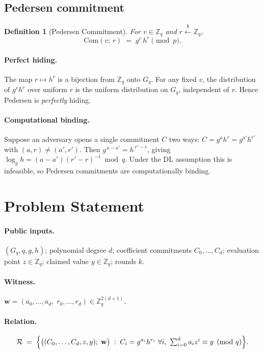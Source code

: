 \documentclass[11pt,a4paper]{article}
\newtheorem{definition}{Definition}
\begin{document}
\subsection{Pedersen commitment}

\begin{definition}[Pedersen Commitment]
For $v \in \mathbb{Z}_q$ and $r \xleftarrow{\$} \mathbb{Z}_q$,
\[
\mathrm{Com}(v;\,r) \;=\; g^{v}\,h^{r} \pmod p.
\]
\end{definition}

\paragraph{Perfect hiding.} The map $r \mapsto h^{r}$ is a bijection from
$\mathbb{Z}_q$ onto $G_q$. For any fixed $v$, the distribution of
$g^{v}h^{r}$ over uniform $r$ is the uniform distribution on $G_q$,
independent of $v$. Hence Pedersen is \emph{perfectly} hiding.

\paragraph{Computational binding.} Suppose an adversary opens a single
commitment $C$ two ways: $C = g^{a}h^{r} = g^{a'}h^{r'}$ with
$(a,r)\neq(a',r')$. Then $g^{\,a-a'} = h^{\,r'-r}$, giving
$\log_g h = (a-a')(r'-r)^{-1} \bmod q$. Under the DL assumption this is
infeasible, so Pedersen commitments are computationally binding.

\section{Problem Statement}

\paragraph{Public inputs.} $(G_q, q, g, h)$; polynomial degree $d$;
coefficient commitments $C_0,\dots,C_d$; evaluation point
$z \in \mathbb{Z}_q$; claimed value $y \in \mathbb{Z}_q$; rounds $k$.

\paragraph{Witness.} $\mathbf{w} = (a_0,\dots,a_d,\; r_0,\dots,r_d)
\in \mathbb{Z}_q^{2(d+1)}$.

\paragraph{Relation.}
\[
\mathcal{R} \;=\; \Bigl\{\bigl((C_0,\dots,C_d,z,y);\;\mathbf{w}\bigr)
\;:\; C_i = g^{a_i}h^{r_i}\ \forall i,\
\textstyle\sum_{i=0}^{d} a_i z^{i} \equiv y \pmod q \Bigr\}.
\]
\end{document}
